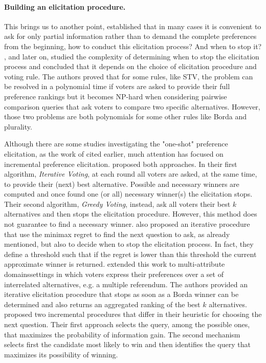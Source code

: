 \paragraph{Building an elicitation procedure.}
This brings us to another point, established that in many cases it is convenient to ask for only partial information rather than to demand the complete preferences from the beginning, how to conduct this elicitation process? And when to stop it?
\citet{Conitzer2002}, and \citet{Walsh2009} later on, studied the complexity of determining when to stop the elicitation process and concluded that it depends on the choice of elicitation procedure and voting rule. The authors proved that for some rules, like \ac{STV}, the problem can be resolved in a polynomial time if voters are asked to provide their full preference rankings but it becomes NP-hard when considering pairwise comparison queries that ask voters to compare two specific alternatives. However, those two problems are both polynomials for some other rules like Borda and plurality.

Although there are some studies investigating the "one-shot" preference elicitation, as the work of \citet{Lu2011Prob} cited earlier, much attention has focused on incremental preference elicitation.
\citet{Kalech2011} proposed both approaches. In their first algorithm, \textit{Iterative Voting}, at each round all voters are asked, at the same time, to provide their (next) best alternative. Possible and necessary winners are computed and once found one (or all) necessary winner(s) the elicitation stops. Their second algorithm, \textit{Greedy Voting}, instead, ask all voters their best $k$ alternatives and then stops the elicitation procedure. However, this method does not guarantee to find a necessary winner.
\citet{Lu2011} also proposed an iterative procedure that use the minimax regret to find the next question to ask, as already mentioned, but also to decide when to stop the elicitation process. In fact, they define a threshold such that if the regret is lower than this threshold the current approximate winner is returned.
\citet{Benabbou2016} extended this work to multi-attribute domains\textemdash settings in which voters express their preferences over a set of interrelated alternatives, e.g. a multiple referendum. The authors provided an iterative elicitation procedure that stops as soon as a Borda winner can be determined and also returns an aggregated ranking of the best $k$ alternatives.
\citet{Naamani-Dery2015} proposed two incremental procedures that differ in their heuristic for choosing the next question. Their first approach selects the query, among the possible ones, that maximizes the probability of information gain. The second mechanism selects first the candidate most likely to win and then identifies the query that maximizes its possibility of winning.

